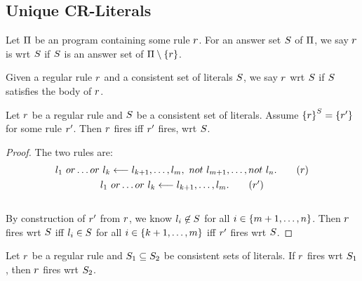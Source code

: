 \documentclass{paper}
\begin{document}
\begin{flushleft}
\subsection{Unique CR-Literals}

\begin{definition}

Let $\Pi$ be an \ap{} program containing some rule $r$.
For an answer set $S$ of $\Pi$, we say $r$ is
 wrt $S$ if $S$ is an answer set
of $\Pi \setminus \{r\}$.

\end{definition}

\begin{definition}

Given a regular rule $r$ and a consistent set of literals
$S$, we say $r$  wrt $S$ if
$S$ satisfies the body of $r$.

\end{definition}

\begin{lemma}
\label{unreduced_rule_fires_iff}

Let $r$ be a regular rule and $S$ be a
consistent set of literals.
Assume ${\{r\}}^{S} = \{{r}'\}$ for some
\dnf{} rule ${r}'$.
Then $r$ fires iff ${r}'$ fires, wrt $S$.

\end{lemma}

\begin{proof}

The two rules are:
\begin{gather*}
\regrule \tag{$\rl$} \\
\regrulenodefneg \tag{$\ot\rl$}
\end{gather*} \\
By construction of ${r}'$ from $r$,
we know ${l}_{i} \not\in S$ for all $i \in
\{m + 1, \ldots, n\}$.
Then $r$ fires wrt $S$ iff
${l}_{i} \in S$ for all
$i \in \{k + 1, \ldots, m\}$ iff
${r}'$ fires wrt $S$.

\end{proof}

\begin{remark}
\label{superset_fires}

Let $r$ be a regular \dnf{} rule and
${S}_{1} \subseteq {S}_{2}$ be consistent sets of literals.
If $r$ fires wrt ${S}_{1}$, then $r$ fires wrt
${S}_{2}$.


\end{remark}
\end{flushleft}
\end{document}
